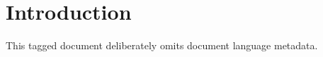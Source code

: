 \documentclass[11pt]{article}
\begin{document}
\section{Introduction}
This tagged document deliberately omits document language metadata.
\end{document}
